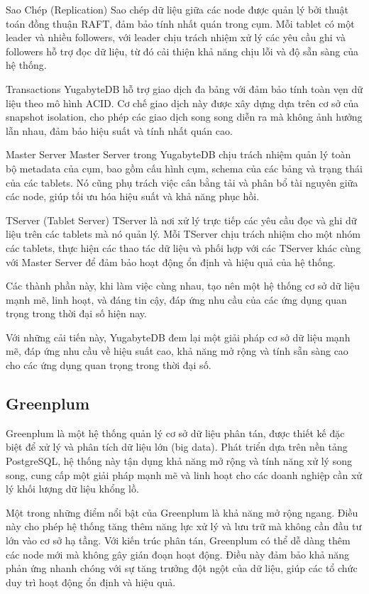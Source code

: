 \documentclass[14pt]{article}
\begin{document}
Sao Chép (Replication)
Sao chép dữ liệu giữa các node được quản lý bởi thuật toán đồng thuận RAFT, đảm bảo tính nhất quán trong cụm. Mỗi tablet có một leader và nhiều followers, với leader chịu trách nhiệm xử lý các yêu cầu ghi và followers hỗ trợ đọc dữ liệu, từ đó cải thiện khả năng chịu lỗi và độ sẵn sàng của hệ thống.

Transactions
YugabyteDB hỗ trợ giao dịch đa bảng với đảm bảo tính toàn vẹn dữ liệu theo mô hình ACID. Cơ chế giao dịch này được xây dựng dựa trên cơ sở của snapshot isolation, cho phép các giao dịch song song diễn ra mà không ảnh hưởng lẫn nhau, đảm bảo hiệu suất và tính nhất quán cao.

Master Server
Master Server trong YugabyteDB chịu trách nhiệm quản lý toàn bộ metadata của cụm, bao gồm cấu hình cụm, schema của các bảng và trạng thái của các tablets. Nó cũng phụ trách việc cân bằng tải và phân bổ tài nguyên giữa các node, giúp tối ưu hóa hiệu suất và khả năng phục hồi.

TServer (Tablet Server)
TServer là nơi xử lý trực tiếp các yêu cầu đọc và ghi dữ liệu trên các tablets mà nó quản lý. Mỗi TServer chịu trách nhiệm cho một nhóm các tablets, thực hiện các thao tác dữ liệu và phối hợp với các TServer khác cùng với Master Server để đảm bảo hoạt động ổn định và hiệu quả của hệ thống.

Các thành phần này, khi làm việc cùng nhau, tạo nên một hệ thống cơ sở dữ liệu mạnh mẽ, linh hoạt, và đáng tin cậy, đáp ứng nhu cầu của các ứng dụng quan trọng trong thời đại số hiện nay.

Với những cải tiến này, YugabyteDB đem lại một giải pháp cơ sở dữ liệu mạnh mẽ, đáp ứng nhu cầu về hiệu suất cao, khả năng mở rộng và tính sẵn sàng cao cho các ứng dụng quan trọng trong thời đại số.

\subsection{Greenplum}


Greenplum là một hệ thống quản lý cơ sở dữ liệu phân tán, được thiết kế đặc biệt để xử lý và phân tích dữ liệu lớn (big data). Phát triển dựa trên nền tảng PostgreSQL, hệ thống này tận dụng khả năng mở rộng và tính năng xử lý song song, cung cấp một giải pháp mạnh mẽ và linh hoạt cho các doanh nghiệp cần xử lý khối lượng dữ liệu khổng lồ.

Một trong những điểm nổi bật của Greenplum là khả năng mở rộng ngang. Điều này cho phép hệ thống tăng thêm năng lực xử lý và lưu trữ mà không cần đầu tư lớn vào cơ sở hạ tầng. Với kiến trúc phân tán, Greenplum có thể dễ dàng thêm các node mới mà không gây gián đoạn hoạt động. Điều này đảm bảo khả năng phản ứng nhanh chóng với sự tăng trưởng đột ngột của dữ liệu, giúp các tổ chức duy trì hoạt động ổn định và hiệu quả.
\end{document}
